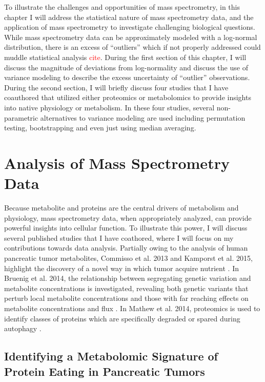 To illustrate the challenges and opportunities of mass spectrometry, in this chapter I will address the statistical nature of mass spectrometry data, and the application of mass spectrometry to investigate challenging biological questions.  While mass spectrometry data can be approximately modeled with a log-normal distribution, there is an excess of ``outliers'' which if not properly addressed could muddle statistical analysis \textcolor{red}{cite}. During the first section of this chapter, I will discuss the magnitude of deviations from log-normality and discuss the use of variance modeling to describe the excess uncertainty of ``outlier'' observations.  During the second section, I will briefly discuss four studies that I have coauthored that utilized either proteomics or metabolomics to provide insights into native physiology or metabolism. In these four studies, several non-parametric alternatives to variance modeling are used including permutation testing, bootstrapping and even just using median averaging.




\section{Analysis of Mass Spectrometry Data}

Because metabolite and proteins are the central drivers of metabolism and physiology, mass spectrometry data, when appropriately analyzed, can provide powerful insights into cellular function.  To illustrate this power, I will discuss several published studies that I have coathored, where I will focus on my contributions towards data analysis. Partially owing to the analysis of human pancreatic tumor metabolites, Commisso et al. 2013 and Kamporst et al. 2015, highlight the discovery of a novel way in which tumor acquire nutrient \cite{Commisso:2013hz, Kamphorst:2015cc}.  In Bruenig et al. 2014, the relationship between segregating genetic variation and metabolite concentrations is investigated, revealing both genetic variants that perturb local metabolite concentrations and those with far reaching effects on metabolite concentrations and flux \cite{Breunig:2014bu}.  In Mathew et al. 2014, proteomics is used to identify classes of proteins which are specifically degraded or spared during autophagy \cite{Mathew:2014hz}.


\subsection{Identifying a Metabolomic Signature of Protein Eating in Pancreatic Tumors}

